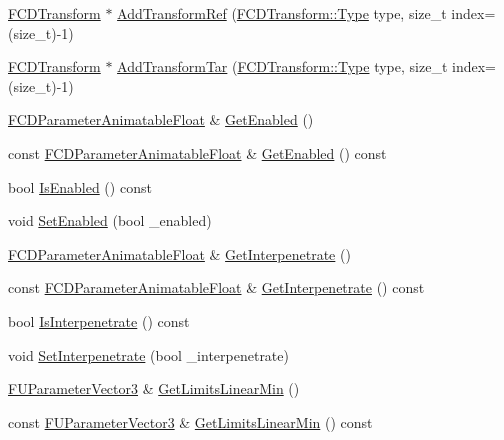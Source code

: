 \begin{DoxyCompactItemize}
\item 
\hyperlink{classFCDTransform}{FCDTransform} $\ast$ \hyperlink{classFCDPhysicsRigidConstraint_aa640f671262ab9dae5f71dfa00c3d5ff}{AddTransformRef} (\hyperlink{classFCDTransform_a13e561c5e53aeaf84dedf4661cdc8921}{FCDTransform::Type} type, size\_\-t index=(size\_\-t)-\/1)
\item 
\hyperlink{classFCDTransform}{FCDTransform} $\ast$ \hyperlink{classFCDPhysicsRigidConstraint_a767751e1fec6557d92c0fabf047ae878}{AddTransformTar} (\hyperlink{classFCDTransform_a13e561c5e53aeaf84dedf4661cdc8921}{FCDTransform::Type} type, size\_\-t index=(size\_\-t)-\/1)
\item 
\hyperlink{classFCDParameterAnimatableT}{FCDParameterAnimatableFloat} \& \hyperlink{classFCDPhysicsRigidConstraint_a2dcfbcd57a613445ec3e90e0c7394538}{GetEnabled} ()
\item 
const \hyperlink{classFCDParameterAnimatableT}{FCDParameterAnimatableFloat} \& \hyperlink{classFCDPhysicsRigidConstraint_aff637d7813284bfbd7b4ba430f6b0fa6}{GetEnabled} () const 
\item 
bool \hyperlink{classFCDPhysicsRigidConstraint_aa118dc6e91437e7294210193cd9a1a52}{IsEnabled} () const 
\item 
void \hyperlink{classFCDPhysicsRigidConstraint_a29ce8a1fdf43832609641b1878391094}{SetEnabled} (bool \_\-enabled)
\item 
\hyperlink{classFCDParameterAnimatableT}{FCDParameterAnimatableFloat} \& \hyperlink{classFCDPhysicsRigidConstraint_a9713d6ef58dc43a391eb148de3f70647}{GetInterpenetrate} ()
\item 
const \hyperlink{classFCDParameterAnimatableT}{FCDParameterAnimatableFloat} \& \hyperlink{classFCDPhysicsRigidConstraint_a26e5f9dcd04acbf64cbc022c559bb2c1}{GetInterpenetrate} () const 
\item 
bool \hyperlink{classFCDPhysicsRigidConstraint_a847f584ac90b0b75a8e8429c2c961583}{IsInterpenetrate} () const 
\item 
void \hyperlink{classFCDPhysicsRigidConstraint_ad0ea420e99ac86f54f015b2a976cb7ca}{SetInterpenetrate} (bool \_\-interpenetrate)
\item 
\hyperlink{classFUParameterT}{FUParameterVector3} \& \hyperlink{classFCDPhysicsRigidConstraint_ad2f35d2c92bbca72cee81fd098ac2322}{GetLimitsLinearMin} ()
\item 
const \hyperlink{classFUParameterT}{FUParameterVector3} \& \hyperlink{classFCDPhysicsRigidConstraint_aa144e26fa4bd23eca297f3b0b6b0d47c}{GetLimitsLinearMin} () const 
\item 

\end{DoxyCompactItemize}

